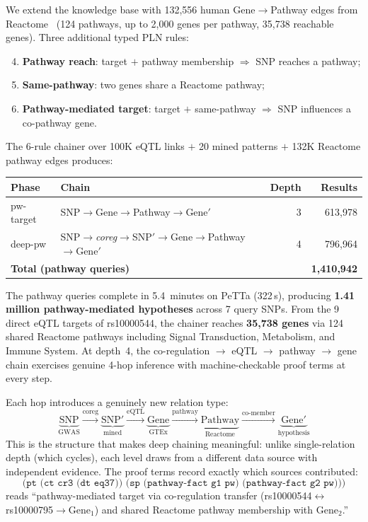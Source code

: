 \documentclass[11pt,openany]{report}
\begin{document}
We extend the knowledge base with 132{,}556 human Gene$\to$Pathway
edges from Reactome~\cite{Fabregat2018Reactome} (124 pathways, up to 2{,}000
genes per pathway, 35{,}738 reachable genes).  Three additional
typed PLN rules:
\begin{enumerate}
\setcounter{enumi}{3}
\item \textbf{Pathway reach}: target $+$ pathway membership
  $\Rightarrow$ SNP reaches a pathway;
\item \textbf{Same-pathway}: two genes share a Reactome pathway;
\item \textbf{Pathway-mediated target}: target $+$ same-pathway
  $\Rightarrow$ SNP influences a co-pathway gene.
\end{enumerate}

The 6-rule chainer over 100K eQTL links $+$ 20 mined patterns $+$
132K Reactome pathway edges produces:

\begin{center}
\begin{tabular}{llrr}
\toprule
Phase & Chain & Depth & Results \\
\midrule
pw-target  & SNP$\to$Gene$\to$Pathway$\to$Gene$'$
  & 3 & 613{,}978 \\
deep-pw & SNP$\to$\textit{coreg}$\to$SNP$'\to$Gene$\to$Pathway$\to$Gene$'$
  & 4 & 796{,}964 \\
\midrule
\multicolumn{2}{l}{\textbf{Total (pathway queries)}} & & \textbf{1{,}410{,}942} \\
\bottomrule
\end{tabular}
\end{center}

\noindent
The pathway queries complete in 5.4~minutes on PeTTa (322\,s),
producing \textbf{1.41 million pathway-mediated hypotheses} across
7 query SNPs.  From the 9 direct eQTL targets of rs10000544,
the chainer reaches \textbf{35{,}738 genes} via 124 shared
Reactome pathways including Signal Transduction, Metabolism, and
Immune System.  At depth~4, the co-regulation $\to$ eQTL $\to$
pathway $\to$ gene chain exercises genuine 4-hop inference with
machine-checkable proof terms at every step.

Each hop introduces a genuinely new relation type:
\[
  \underbrace{\text{SNP}}_{\text{GWAS}}
  \xrightarrow{\text{coreg}}
  \underbrace{\text{SNP}'}_{\text{mined}}
  \xrightarrow{\text{eQTL}}
  \underbrace{\text{Gene}}_{\text{GTEx}}
  \xrightarrow{\text{pathway}}
  \underbrace{\text{Pathway}}_{\text{Reactome}}
  \xrightarrow{\text{co-member}}
  \underbrace{\text{Gene}'}_{\text{hypothesis}}
\]
This is the structure that makes deep chaining meaningful:
unlike single-relation depth (which cycles), each level draws
from a different data source with independent evidence.  The
proof terms record exactly which sources contributed:
\[
  \texttt{(pt~(ct~cr3~(dt~eq37))~(sp~(pathway-fact~g1~pw)~(pathway-fact~g2~pw)))}
\]
reads ``pathway-mediated target via co-regulation transfer
(rs10000544$\leftrightarrow$rs10000795$\to$Gene$_1$) and
shared Reactome pathway membership with Gene$_2$.''
\end{document}
